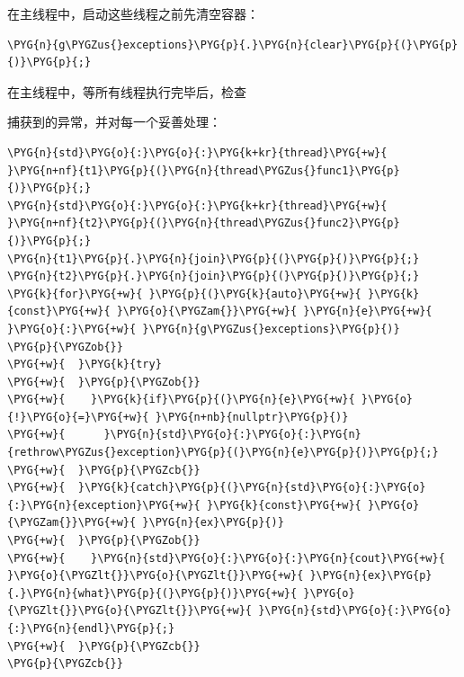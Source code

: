 
在主线程中，启动这些线程之前先清空容器：



\begin{codeblockbg}
\begin{Verbatim}[commandchars=\\\{\},breaklines=true,breakanywhere=true,fontsize=\codefont,xleftmargin=17bp]
\PYG{n}{g\PYGZus{}exceptions}\PYG{p}{.}\PYG{n}{clear}\PYG{p}{(}\PYG{p}{)}\PYG{p}{;}
\end{Verbatim}
\end{codeblockbg}



在主线程中，等所有线程执行完毕后，检查



捕获到的异常，并对每一个妥善处理：



\begin{codeblockbg}
\begin{Verbatim}[commandchars=\\\{\},breaklines=true,breakanywhere=true,fontsize=\codefont,xleftmargin=17bp]
\PYG{n}{std}\PYG{o}{:}\PYG{o}{:}\PYG{k+kr}{thread}\PYG{+w}{ }\PYG{n+nf}{t1}\PYG{p}{(}\PYG{n}{thread\PYGZus{}func1}\PYG{p}{)}\PYG{p}{;}
\PYG{n}{std}\PYG{o}{:}\PYG{o}{:}\PYG{k+kr}{thread}\PYG{+w}{ }\PYG{n+nf}{t2}\PYG{p}{(}\PYG{n}{thread\PYGZus{}func2}\PYG{p}{)}\PYG{p}{;}
\PYG{n}{t1}\PYG{p}{.}\PYG{n}{join}\PYG{p}{(}\PYG{p}{)}\PYG{p}{;}
\PYG{n}{t2}\PYG{p}{.}\PYG{n}{join}\PYG{p}{(}\PYG{p}{)}\PYG{p}{;}
\PYG{k}{for}\PYG{+w}{ }\PYG{p}{(}\PYG{k}{auto}\PYG{+w}{ }\PYG{k}{const}\PYG{+w}{ }\PYG{o}{\PYGZam{}}\PYG{+w}{ }\PYG{n}{e}\PYG{+w}{ }\PYG{o}{:}\PYG{+w}{ }\PYG{n}{g\PYGZus{}exceptions}\PYG{p}{)}
\PYG{p}{\PYGZob{}}
\PYG{+w}{  }\PYG{k}{try}
\PYG{+w}{  }\PYG{p}{\PYGZob{}}
\PYG{+w}{    }\PYG{k}{if}\PYG{p}{(}\PYG{n}{e}\PYG{+w}{ }\PYG{o}{!}\PYG{o}{=}\PYG{+w}{ }\PYG{n+nb}{nullptr}\PYG{p}{)}
\PYG{+w}{      }\PYG{n}{std}\PYG{o}{:}\PYG{o}{:}\PYG{n}{rethrow\PYGZus{}exception}\PYG{p}{(}\PYG{n}{e}\PYG{p}{)}\PYG{p}{;}
\PYG{+w}{  }\PYG{p}{\PYGZcb{}}
\PYG{+w}{  }\PYG{k}{catch}\PYG{p}{(}\PYG{n}{std}\PYG{o}{:}\PYG{o}{:}\PYG{n}{exception}\PYG{+w}{ }\PYG{k}{const}\PYG{+w}{ }\PYG{o}{\PYGZam{}}\PYG{+w}{ }\PYG{n}{ex}\PYG{p}{)}
\PYG{+w}{  }\PYG{p}{\PYGZob{}}
\PYG{+w}{    }\PYG{n}{std}\PYG{o}{:}\PYG{o}{:}\PYG{n}{cout}\PYG{+w}{ }\PYG{o}{\PYGZlt{}}\PYG{o}{\PYGZlt{}}\PYG{+w}{ }\PYG{n}{ex}\PYG{p}{.}\PYG{n}{what}\PYG{p}{(}\PYG{p}{)}\PYG{+w}{ }\PYG{o}{\PYGZlt{}}\PYG{o}{\PYGZlt{}}\PYG{+w}{ }\PYG{n}{std}\PYG{o}{:}\PYG{o}{:}\PYG{n}{endl}\PYG{p}{;}
\PYG{+w}{  }\PYG{p}{\PYGZcb{}}
\PYG{p}{\PYGZcb{}}
\end{Verbatim}
\end{codeblockbg}


